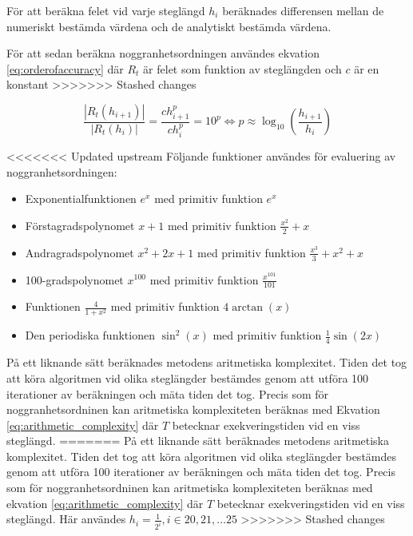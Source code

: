 \documentclass[a4paper,titlepage]{article}
\begin{document}
För att beräkna felet vid varje steglängd $h_i$ beräknades differensen mellan de numeriskt
bestämda värdena och de analytiskt bestämda värdena.

För att sedan beräkna noggranhetsordningen användes ekvation \ref{eq:orderofaccuracy} där $R_t$
är felet som funktion av steglängden och $c$ är en konstant
>>>>>>> Stashed changes

\begin{equation}
    \label{eq:orderofaccuracy}
    \frac{| R_t(h_{i+1})|}{| R_t(h_{i})|}  = \frac{ch_{i+1}^p}{ch_{i}^p} = 10^p
    \Leftrightarrow p \approx \log_{10}\left( \frac{h_{i+1}}{h_i} \right)
\end{equation}

<<<<<<< Updated upstream
Följande funktioner användes för evaluering av noggranhetsordningen:

\begin{itemize}
    \item Exponentialfunktionen $e^x$ med primitiv funktion $e^x$
    \item Förstagradspolynomet $x + 1$ med primitiv funktion $\frac{x^2}{2} + x$
    \item Andragradspolynomet $x^2 + 2x + 1$ med primitiv funktion
        $\frac{x^3}{3} + x^2 + x$
    \item 100-gradspolynomet $x^{100}$ med primitiv funktion
        $\frac{x^{101}}{101}$
    \item Funktionen $\frac{4}{1 + x^2}$ med primitiv funktion $4\arctan(x)$
    \item Den periodiska funktionen $\sin^2(x)$ med primitiv funktion
        $\frac{1}{4}\sin(2x)$
\end{itemize}


På ett liknande sätt beräknades metodens aritmetiska komplexitet. Tiden det tog att köra
algoritmen vid olika steglängder bestämdes genom att utföra 100 iterationer av beräkningen
och mäta tiden det tog. Precis som för noggranhetsordninen kan aritmetiska komplexiteten
beräknas med Ekvation \ref{eq:arithmetic_complexity} där $T$ betecknar exekveringstiden
vid en viss steglängd.
=======
På ett liknande sätt beräknades metodens aritmetiska komplexitet. Tiden det tog att köra
algoritmen vid olika steglängder bestämdes genom att utföra 100 iterationer av beräkningen
och mäta tiden det tog. Precis som för noggranhetsordninen kan aritmetiska komplexiteten
beräknas med ekvation \ref{eq:arithmetic_complexity} där $T$ betecknar exekveringstiden
vid en viss steglängd. Här användes $h_i = \frac{1}{2^i}, i \in {20,21, \dots 25}$
>>>>>>> Stashed changes
\end{document}
